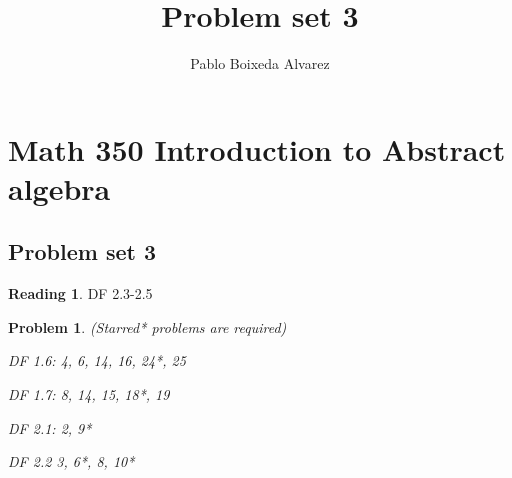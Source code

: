 \documentclass[11 pt]{article}
\title{Problem set 3}
\author{Pablo Boixeda Alvarez}
\newtheorem{Prob}{Problem}
\theoremstyle{definition}
\newtheorem{re}{Reading}
\theoremstyle{remark}
\begin{document}
\section*{Math 350 Introduction to Abstract algebra}
\subsection*{Problem set 3}

\begin{re}
	DF 2.3-2.5
\end{re}
\begin{Prob} (Starred* problems are required)
	
	DF 1.6:  4, 6, 14, 16, 24*, 25
	
	DF 1.7: 8, 14, 15, 18*, 19
	
	DF 2.1: 2, 9*
	
	DF 2.2 3, 6*, 8, 10*
\end{Prob}
\end{document}
